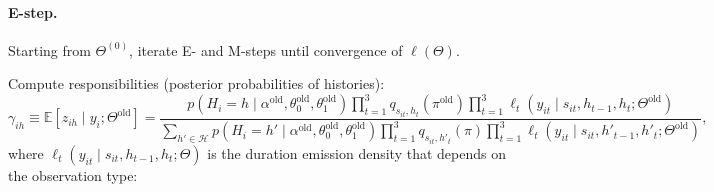 \documentclass[12pt]{article}
\begin{document}



\paragraph{E-step.}

Starting from \(\Theta^{(0)}\), iterate E- and M-steps until convergence of \(\ell(\Theta)\).

Compute responsibilities (posterior probabilities of histories):
\begin{equation}
\gamma_{ih}\equiv \mathbb{E}[z_{ih}\mid y_i;\Theta^{\text{old}}]
=\frac{p(H_i=h\mid\alpha^{\text{old}},\theta_0^{\text{old}},\theta_1^{\text{old}})\prod_{t=1}^3 q_{s_{it},h_t}(\pi^{\text{old}})\prod_{t=1}^3\ell_t(y_{it}\mid s_{it},h_{t-1},h_t;\Theta^{\text{old}})}
{\sum_{h'\in\mathcal{H}} p(H_i=h'\mid\alpha^{\text{old}},\theta_0^{\text{old}},\theta_1^{\text{old}})\prod_{t=1}^3 q_{s_{it},h'_t}(\pi)\prod_{t=1}^3\ell_t(y_{it}\mid s_{it},h'_{t-1},h'_t;\Theta^{\text{old}})},
\label{eq:resp}
\end{equation}
where \(\ell_t(y_{it}\mid s_{it},h_{t-1},h_t;\Theta)\) is the duration emission density that depends on the observation type:
\end{document}
